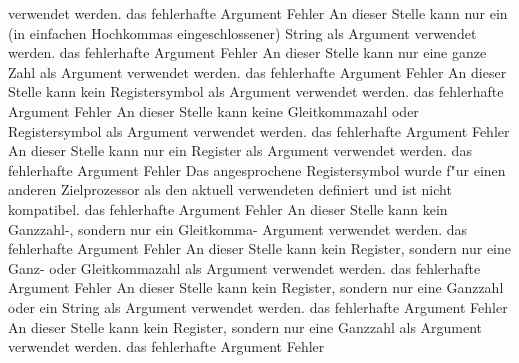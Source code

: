 \documentclass[12pt,a4paper,twoside]{report}
\begin{document}
\begin{description}
{                verwendet werden.}
               {das fehlerhafte Argument}
               {Fehler}
               {An dieser Stelle kann nur ein (in einfachen Hochkommas
                eingeschlossener) String als Argument verwendet werden.}
               {das fehlerhafte Argument}
               {Fehler}
               {An dieser Stelle kann nur eine ganze Zahl als Argument
                verwendet werden.}
               {das fehlerhafte Argument}
               {Fehler}
               {An dieser Stelle kann kein Registersymbol als Argument verwendet werden.}
               {das fehlerhafte Argument}
               {Fehler}
               {An dieser Stelle kann keine Gleitkommazahl oder Registersymbol als Argument verwendet werden.}
               {das fehlerhafte Argument}
               {Fehler}
               {An dieser Stelle kann nur ein Register als Argument verwendet werden.}
               {das fehlerhafte Argument}
               {Fehler}
               {Das angesprochene Registersymbol wurde f"ur einen anderen Zielprozessor
                als den aktuell verwendeten definiert und ist nicht kompatibel.}
               {das fehlerhafte Argument}
               {Fehler}
               {An dieser Stelle kann kein Ganzzahl-, sondern nur ein Gleitkomma-
                Argument verwendet werden.}
               {das fehlerhafte Argument}
               {Fehler}
               {An dieser Stelle kann kein Register, sondern nur eine Ganz-
                oder Gleitkommazahl als Argument verwendet werden.}
               {das fehlerhafte Argument}
               {Fehler}
               {An dieser Stelle kann kein Register, sondern nur eine Ganzzahl
                 oder ein String als Argument verwendet werden.}
               {das fehlerhafte Argument}
               {Fehler}
               {An dieser Stelle kann kein Register, sondern nur eine Ganzzahl
                als Argument verwendet werden.}
               {das fehlerhafte Argument}
               {Fehler}

\end{description}
\end{document}
